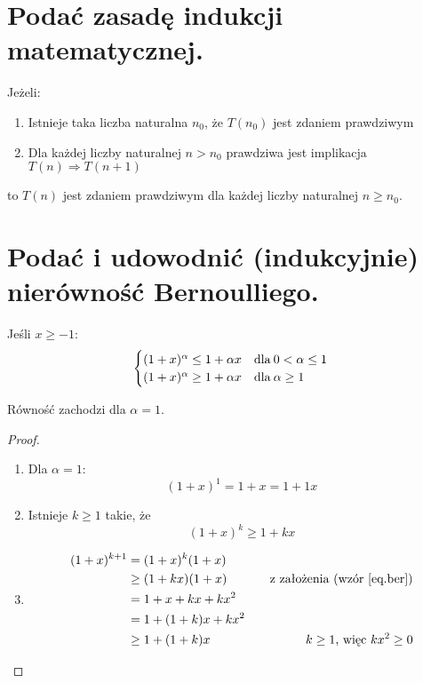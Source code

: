 \documentclass{article}
\numberwithin{equation}{section}
\theoremstyle{definition}
\theoremstyle{case}
\let\implies\Rightarrow
\begin{document}
\section{Podać zasadę indukcji matematycznej.}
Jeżeli:
\begin{enumerate}
	\item Istnieje taka liczba naturalna $n_0$, że $T(n_0)$ jest zdaniem prawdziwym
	\item Dla każdej liczby naturalnej $n>n_0$ prawdziwa jest implikacja $T(n) \implies T(n+1)$
\end{enumerate}
to $T(n)$ jest zdaniem prawdziwym dla każdej liczby naturalnej $n \geq n_0$.

\section{Podać i udowodnić (indukcyjnie) nierówność Bernoulliego.}
\begin{multicols}{2}
	Jeśli $x \geq -1$:
	\begin{equation*}
		\begin{cases}
			(1+x)^\alpha \leq 1 + \alpha x & \textnormal{dla\:} 0 < \alpha \leq 1
			\\ (1+x)^\alpha \geq 1 + \alpha x & \textnormal{dla\:} \alpha \geq 1
		\end{cases}
	\end{equation*}
	\vspace*{\fill}

	Równość zachodzi dla $\alpha = 1$.
\end{multicols}
\begin{proof}
	\begin{enumerate}
		\item
			Dla $\alpha = 1$:
			\begin{equation*}
				(1+x)^1 = 1+x = 1 + 1x
			\end{equation*}
		\item
			Istnieje $k \geq 1$ takie, że
			\begin{equation}
				\label{eq.ber}
				(1+x)^k \geq 1 + kx
			\end{equation}
		\item
			\begin{align*}
				(1+x)^{k+1}
				   &= (1+x)^k (1+x)
				\\ &\geq (1+kx)(1+x) &\textnormal{\quad z założenia (wzór \ref{eq.ber})}
				\\ &= 1+x+kx+kx^2
				\\ &= 1+(1+k)x+kx^2
				\\ &\geq 1+(1+k)x &\textnormal{\quad $k\geq 1$, więc $kx^2\geq 0$}
			\end{align*}
	\end{enumerate}
\end{proof}
\end{document}
